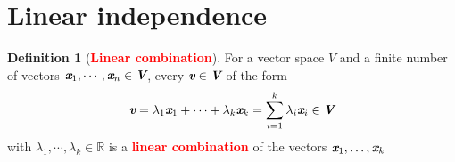 \documentclass[12pt]{article}
\theoremstyle{definition}
\newtheorem{definition}{Definition}[section]
\newcommand{\keyword}[1]{\textbf{\textcolor{red}{#1}}}
\newcommand{\mat}[1]{\textit{\textbf{#1}}}
\begin{document}
    \section{Linear independence}
        \begin{definition}[\keyword{Linear combination}]
            For a vector space $V$ and a finite number of vectors 
            $\mat{x}_1,\cdots,\mat{x}_n\in \mat{V}$, every $\mat{v}\in\mat{V}$ 
            of the form 
            \begin{equation*}
                \mat{v}=\lambda_1\mat{x}_1+\cdots+\lambda_k\mat{x}_k=\sum_{i=1}^{k}\lambda_i\mat{x}_i\in\mat{V}
            \end{equation*}
            with $\lambda_1,\cdots,\lambda_k\in\mathbb{R}$ is a 
            \keyword{linear combination} of the vectors $\mat{x}_1,\dots,\mat{x}_k$
        \end{definition}
\end{document}
